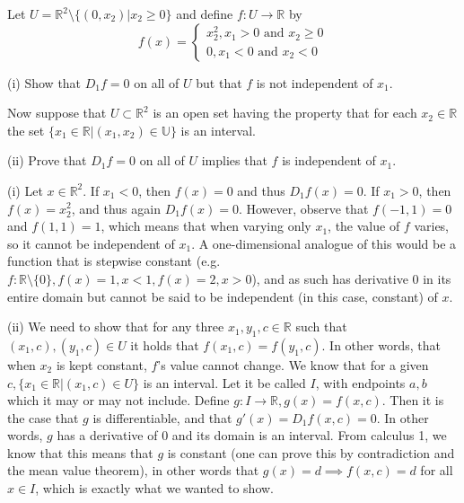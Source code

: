 \begin{solution}
\end{solution}

\begin{exercise}{18}
    Let $U = \mathbb{R}^2 \setminus \{(0, x_2) \lvert x_2 \geq 0\}$ and define $f: U \rightarrow \mathbb{R}$ by
    $$f(x) = \begin{cases}
        x_2^2, x_1 > 0 \text{ and } x_2 \geq 0 \\
        0, x_1 < 0 \text{ and } x_2 < 0
    \end{cases}$$

    (i) Show that $D_1 f = 0$ on all of $U$ but that $f$ is not independent of $x_1$.

    Now suppose that $U \subset \mathbb{R}^2$ is an open set having the property that for each $x_2 \in \mathbb{R}$ the set $\{ x_1 \in \mathbb{R} \lvert (x_1, x_2) \in \mathbb{U}\}$ is an interval.

    (ii) Prove that $D_1 f = 0$ on all of $U$ implies that $f$ is independent of $x_1$.
\end{exercise}

\begin{solution}

    (i) Let $x \in \mathbb{R}^2$.
    If $x_1 < 0$, then $f(x) = 0$ and thus $D_1 f(x) = 0$.
    If $x_1 > 0$, then $f(x) = x_2^2$, and thus again $D_1 f(x) = 0$.
    However, observe that $f(-1, 1) = 0$ and $f(1, 1) = 1$, which means that when varying only $x_1$, the value of $f$ varies, so it cannot be independent of $x_1$. A one-dimensional analogue of this would be a function that is stepwise constant (e.g. $f :\mathbb{R} \setminus \{0\}, f(x) = 1, x < 1, f(x) = 2, x > 0$), and as such has derivative 0 in its entire domain but cannot be said to be independent (in this case, constant) of $x$.

    (ii) We need to show that for any three $x_1, y_1, c \in \mathbb{R}$ such that $(x_1, c), (y_1, c) \in U$ it holds that $f(x_1, c) = f(y_1, c)$. 
    In other words, that when $x_2$ is kept constant, $f$'s value cannot change.
    We know that for a given $c, \{x_1 \in \mathbb{R} \lvert (x_1, c) \in U\}$ is an interval.
    Let it be called $I$, with endpoints $a, b$ which it may or may not include.
    Define $g: I \rightarrow \mathbb{R}, g(x) = f(x, c)$. 
    Then it is the case that $g$ is differentiable, and that $g'(x) = D_1 f(x, c) = 0$.
    In other words, $g$ has a derivative of 0 and its domain is an interval.
    From calculus 1, we know that this means that $g$ is constant (one can prove this by contradiction and the mean value theorem), in other words that $g(x) = d \implies f(x, c) = d$ for all $x \in I$, which is exactly what we wanted to show.
\end{solution}

